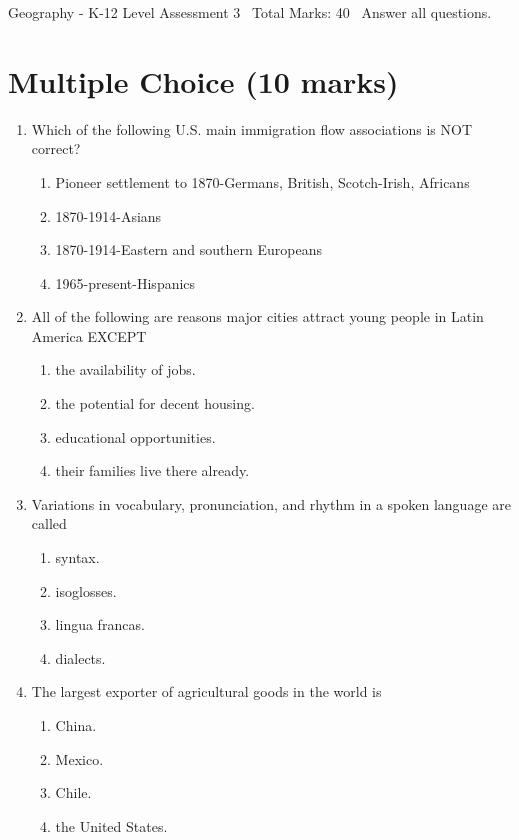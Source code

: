 \documentclass[12pt]{article}
\begin{document}
\begin{center}
Geography - K-12 Level Assessment 3 \
Total Marks: 40 \
Answer all questions.
\end{center}

\section*{Multiple Choice (10 marks)}
\begin{enumerate}[label=\arabic*.]
\item Which of the following U.S. main immigration flow associations is NOT correct?
\begin{enumerate}[label=(\alph*)]
    \item Pioneer settlement to 1870-Germans, British, Scotch-Irish, Africans
    \item 1870-1914-Asians
    \item 1870-1914-Eastern and southern Europeans
    \item 1965-present-Hispanics
\end{enumerate}
\item All of the following are reasons major cities attract young people in Latin America EXCEPT
\begin{enumerate}[label=(\alph*)]
    \item the availability of jobs.
    \item the potential for decent housing.
    \item educational opportunities.
    \item their families live there already.
\end{enumerate}
\item Variations in vocabulary, pronunciation, and rhythm in a spoken language are called
\begin{enumerate}[label=(\alph*)]
    \item syntax.
    \item isoglosses.
    \item lingua francas.
    \item dialects.
\end{enumerate}
\item The largest exporter of agricultural goods in the world is
\begin{enumerate}[label=(\alph*)]
    \item China.
    \item Mexico.
    \item Chile.
    \item the United States.

\end{enumerate}
\end{enumerate}
\end{document}
